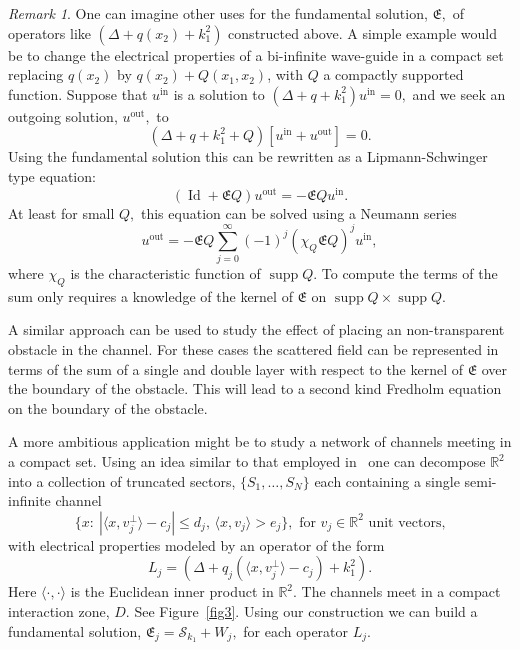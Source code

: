 \documentclass[11pt]{article}
\newcommand\In{\operatorname{in}}
\newcommand\out{\operatorname{out}}
\newcommand\fE{\mathfrak E}
\newcommand\cS{\mathcal{S}}
\newcommand\bbR{\mathbb R}
\newcommand\supp{\operatorname{supp}}
\newcommand\Id{\operatorname{Id}}
\theoremstyle{definition}
\theoremstyle{remark}
\newtheorem{remark}{Remark}
\begin{document}
\begin{remark}
  One can imagine other uses for the fundamental solution, $\fE,$
  of operators like $(\Delta+q(x_2)+k_1^2)$ constructed above.  A
  simple example would be to change the electrical properties of a bi-infinite
  wave-guide in a compact set replacing $q(x_2)$ by $q(x_2)+Q(x_1,x_2)$,
  with $Q$ a compactly supported function.  Suppose that $u^{\In}$ is
  a solution to $(\Delta+q+k_1^2)u^{\In}=0,$ and we seek an outgoing
  solution, $u^{\out},$ to
\begin{equation}
  (\Delta+q+k_1^2+Q)[u^{\In}+u^{\out}]=0.
\end{equation}
Using the fundamental solution this can be rewritten as a Lipmann-Schwinger
type equation:
\begin{equation}
  (\Id+\fE Q)u^{\out}=-\fE Q u^{\In}.
\end{equation}
At least for small $Q,$ this equation can be solved using a Neumann series
\begin{equation}
  u^{\out}=-\fE Q\sum_{j=0}^{\infty}(-1)^j(\chi_Q\fE Q)^ju^{\In},
\end{equation}
where $\chi_Q$ is the characteristic function of $\supp Q.$ To compute the terms
of the sum only requires a knowledge of the kernel of $\fE$ on $\supp
Q\times\supp Q.$

A similar approach can be used to study the effect of placing an
non-transparent obstacle in the channel. For these cases the scattered
field can be represented in terms of the sum of a single and double
layer with respect to the kernel of $\fE$ over the boundary of the
obstacle. This will lead to a second kind Fredholm equation on the
boundary of the obstacle.

A more ambitious application might be to study a network of channels
meeting in a compact set.  Using an idea similar to that employed
in~\cite{BonChaFli_2022} one can decompose $\bbR^2$ into a collection
of truncated sectors, $\{S_1,\dots, S_N\}$ each containing a single
semi-infinite channel
$$\{x:\:|\langle x,v_j^{\bot}\rangle-c_j| \leq d_j,\, \langle
x,v_j\rangle>e_j\}, \text{ for }v_j\in\bbR^2\text{  unit vectors,}$$
with electrical properties modeled by an operator of the form
$$L_j=(\Delta+q_j(\langle x,v_j^{\bot}\rangle-c_j)+k_1^2).$$
Here $\langle\cdot,\cdot\rangle$ is the Euclidean inner product in $\bbR^2.$
The channels meet in a compact interaction zone, $D.$  See
Figure~\ref{fig3}. Using our construction we can build a fundamental
solution, $\fE_j=\cS_{k_1}+W_j,$ for each operator $L_j.$


\end{remark}
\end{document}
